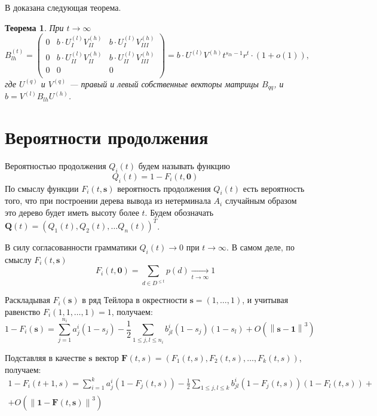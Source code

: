 \documentclass[12pt]{article}
\renewcommand{\leq}{\leqslant}
\newtheorem{theorem}{Теорема}
\begin{document}
{В \cite{zhiltsova-about-matrix} доказана следующая теорема.
\begin{theorem}
	При $t \rightarrow \infty$
	\begin{equation*}
		B^{(t)}_{lh} = 
		\begin{pmatrix}
			0 & b \cdot U^{(l)}_I V^{(h)}_{II}    & b \cdot U^{(l)}_I V^{(h)}_{III} \\
			0 & b \cdot U^{(l)}_{II} V^{(h)}_{II} & b \cdot U^{(l)}_{II} V^{(h)}_{III} \\
			0 & 0 & 0 \\
		\end{pmatrix} =
		b \cdot U^{(l)} V^{(h)} t^{s_{lh} - 1} r^t \cdot (1 + o(1)),
	\end{equation*}
	где $U^{(q)}$ и $V^{(q)}$ --- правый и левый собственные векторы матрицы $B_{qq}$, и $b = V^{(l)} B_{lh} U^{(h)}$.
\end{theorem}

\section{Вероятности продолжения}

Вероятностью продолжения $Q_i(t)$ будем называть функцию
\begin{equation*}
	Q_i(t) = 1 - F_i(t, \mathbf{0})
\end{equation*}
По смыслу функции $F_i(t, \mathbf{s})$ вероятность продолжения $Q_i(t)$ есть вероятность того, что при построении дерева вывода из нетерминала $A_i$ случайным образом это дерево будет иметь высоту более $t$. Будем обозначать $\mathbf{Q}(t) = (Q_1(t), Q_2(t), \ldots Q_n(t))^T$.

В силу согласованности грамматики $Q_i(t) \rightarrow 0$ при $t \rightarrow \infty$. В самом деле, по смыслу $F_i(t, \mathbf{s})$
\begin{equation*}
	F_i(t, \mathbf{0}) = \sum_{d \in D^{\leq t}} p(d) \xrightarrow[t \rightarrow \infty]{} 1
\end{equation*}

Раскладывая $F_i(\mathbf{s})$ в ряд Тейлора в окрестности $\mathbf{s} = (1, \ldots, 1)$, и учитывая равенство $F_i(1, 1, \ldots, 1) = 1$, получаем:
\begin{equation}
	1 - F_i(\mathbf{s}) = \sum_{j = 1}^{n_i} a^i_j(1 - s_j) - \frac{1}{2} \sum_{1 \leq j,l \leq n_i} b^i_{jl} (1 - s_j) (1 - s_l) + O\left( \left\| \mathbf{s} - \mathbf{1} \right\| ^3 \right)
\end{equation}

Подставляя в качестве $\textbf{s}$ вектор $\textbf{F}(t, s) = (F_1(t, s), F_2(t, s), \ldots, F_k(t, s))$, получаем:
\begin{multline}
\label{eq:basic_fi}
	1 - F_i(t + 1, s) = \sum_{i = 1}^k a^i_j (1 - F_j(t,s)) - \frac{1}{2} \sum_{1 \leq j,l \leq k} b^i_{jl} (1 - F_j(t,s)) (1 - F_l(t,s)) + \\
	+ O\left( \left\| \mathbf{1} - \mathbf{F}(t, \mathbf{s}) \right\| ^3 \right)
\end{multline}

}
\end{document}
